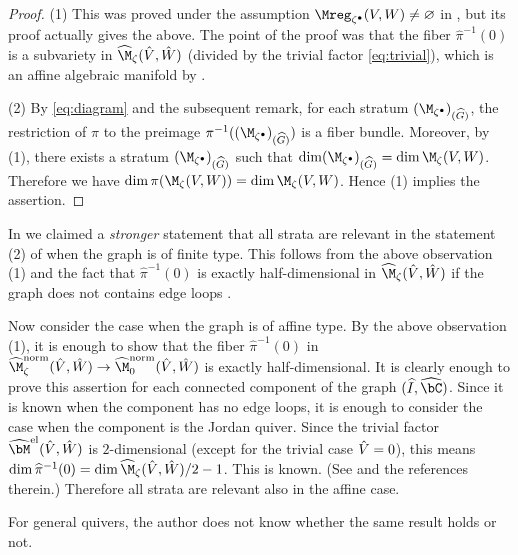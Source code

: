 \begin{proof}
  (1) This was proved under the assumption
  $\Mreg_{\zeta^\bullet}(V,W)\neq\varnothing$ in \cite[6.11]{Na-quiver},
  but its proof actually gives the above. The point of the proof was
  that the f\/iber $\widehat\pi^{-1}(0)$ is a subvariety in
  $\widehat\M_\zeta(\Hat{V},\Hat{W})$ (divided by the trivial factor
  \eqref{eq:trivial}), which is an af\/f\/ine algebraic manifold by
  .

(2) By \eqref{eq:diagram} and the subsequent remark, for each stratum
$(\M_{\zeta^\bullet})_{(\widehat G)}$, the restriction of $\pi$ to the
preimage $\pi^{-1}((\M_{\zeta^\bullet})_{(\widehat G)})$ is a f\/iber bundle.
Moreover, by (1), there exists a stratum $(\M_{\zeta^\bullet})_{(\widehat
  G)}$ such that $\dim (\M_{\zeta^\bullet})_{(\widehat G)} = \dim
\M_\zeta(V,W)$. Therefore we have $\dim \pi(\M_\zeta(V,W)) = \dim
\M_\zeta(V,W)$. Hence (1) implies the assertion.
\end{proof}

\begin{Remark}\label{rem:relevant}
  In \cite[10.11]{Na-alg} we claimed a {\it stronger\/} statement
  that all strata are relevant in the statement (2) of
   when the graph is of f\/inite type. This
  follows from the above observation (1) and the fact that
  $\widehat\pi^{-1}(0)$ is exactly half-dimensional in
  $\widehat{\M}_\zeta(\Hat{V},\Hat{W})$ if the graph does not contains
  edge loops \cite[5.8]{Na-quiver}.

  Now consider the case when the graph is of af\/f\/ine type. By the above
  observation (1), it is enough to show that the f\/iber
  $\widehat\pi^{-1}(0)$ in
  $\widehat{\M}_\zeta^\text{norm}(\Hat{V},\Hat{W})\to
  \widehat{\M}_0^\text{norm}(\Hat{V},\Hat{W})$ is exactly
  half-dimensional. It is clearly enough to prove this assertion for
  each connected component of the graph $(\widehat I,\widehat\bC)$.
  Since it is known when the component has no edge loops, it is enough
  to consider the case when the component is the Jordan quiver.
%
  Since the trivial factor
  $\widehat{\bM}^{\text{el}}(\Hat{V},\Hat{W})$ is $2$-dimensional
  (except for the trivial case $\Hat{V} = 0$), this means $\dim
  \widehat\pi^{-1}(0) = \dim \widehat{\M}_\zeta(\Hat{V},\Hat{W})/2 -
  1$. This is known. (See \cite[Exercise~5.15]{Lecture} and the
  references therein.)
  Therefore all strata are relevant also in the af\/f\/ine case.

  For general quivers, the author does not know whether the same
  result holds or not.
\end{Remark}

